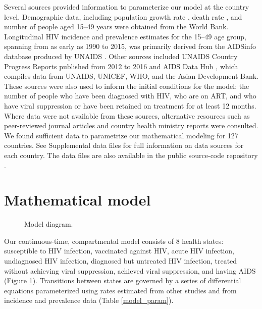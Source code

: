 \documentclass[11pt]{article}
\begin{document}
Several sources provided information to parameterize our model at the
country level. Demographic data, including population growth rate
\cite{WorldBankpg}, death rate
\cite{World_Development_Indicators2013-ee}, and number of people aged
15--49 years \cite{The_World_Bank2016-fd} were obtained from the World
Bank. Longitudinal HIV incidence and prevalence estimates for the
15--49 age group, spanning from as early as 1990 to 2015, was
primarily derived from the AIDSinfo database produced by UNAIDS
\cite{Unaids2016-an}. Other sources included UNAIDS Country Progress
Reports \cite{Unaids2016-am} published from 2012 to 2016 and AIDS Data
Hub \cite{AIDSdatahub-fg}, which compiles data from UNAIDS, UNICEF,
WHO, and the Asian Development Bank. These sources were also used to
inform the initial conditions for the model: the number of people who
have been diagnosed with HIV, who are on ART, and who have viral
suppression or have been retained on treatment for at least 12
months. Where data were not available from these sources, alternative
resources such as peer-reviewed journal articles and country health
ministry reports were consulted.  We found sufficient data to
parametrize our mathematical modeling for 127 countries.  See
Supplemental data files for full information on data sources for each
country.  The data files are also available in the public source-code
repository \cite{medlock2016-git}.


\section{Mathematical model}

\begin{figure}
  \centering
  
  \caption{Model diagram.}
  \label{model_diag}
\end{figure}

Our continuous-time, compartmental model consists of 8 health states:
susceptible to HIV infection, vaccinated against HIV, acute HIV
infection, undiagnosed HIV infection, diagnosed but untreated HIV
infection, treated without achieving viral suppression, achieved viral
suppression, and having AIDS (Figure \ref{model_diag}). Transitions
between states are governed by a series of differential equations
parameterized using rates estimated from other studies and from
incidence and prevalence data (Table \ref{model_param}).
\end{document}
